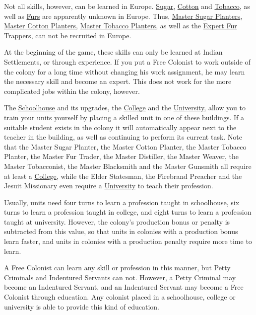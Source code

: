 \documentclass[12pt]{book}
\begin{document}
Not all skills, however, can be learned in Europe.
\hyperlink{Sugar}{Sugar}, \hyperlink{Cotton}{Cotton} and
\hyperlink{Tobacco}{Tobacco}, as well as \hyperlink{Furs}{Furs} are
apparently unknown in Europe. Thus, \hyperlink{Master Sugar
Planter}{Master Sugar Planters}, \hyperlink{Master Cotton
Planter}{Master Cotton Planters}, \hyperlink{Master Tobacco
Planter}{Master Tobacco Planters}, as well as the \hyperlink{Expert
Fur Trapper}{Expert Fur Trappers}, can not be recruited in Europe.

At the beginning of the game, these skills can only be learned at
Indian Settlements, or through experience. If you put a Free Colonist
to work outside of the colony for a long time without changing his
work assignment, he may learn the necessary skill and become an
expert. This does not work for the more complicated jobs within the
colony, however.

The \hyperlink{Schoolhouse}{Schoolhouse} and its upgrades, the
\hyperlink{College}{College} and the
\hyperlink{University}{University}, allow you to train your units
yourself by placing a skilled unit in one of these buildings. If a
suitable student exists in the colony it will automatically appear
next to the teacher in the building, as well as continuing to perform
its current task. Note that the Master Sugar Planter, the Master
Cotton Planter, the Master Tobacco Planter, the Master Fur Trader,
the Master Distiller, the Master Weaver, the Master Tobacconist, the
Master Blacksmith and the Master Gunsmith all require at least a
\hyperlink{College}{College}, while the Elder Statesman, the Firebrand
Preacher and the Jesuit Missionary even require a
\hyperlink{University}{University} to teach their profession.

Usually, units need four turns to learn a profession taught in
schoolhouse, six turns to learn a profession taught in college, and
eight turns to learn a profession taught at university. However, the
colony's production bonus or penalty is subtracted from this value, so
that units in colonies with a production bonus learn faster, and units
in colonies with a production penalty require more time to learn.

A Free Colonist can learn any skill or profession in this manner, but
Petty Criminals and Indentured Servants can not. However, a Petty
Criminal may become an Indentured Servant, and an Indentured Servant
may become a Free Colonist through education. Any colonist placed in a
schoolhouse, college or university is able to provide this kind of
education.
\end{document}
